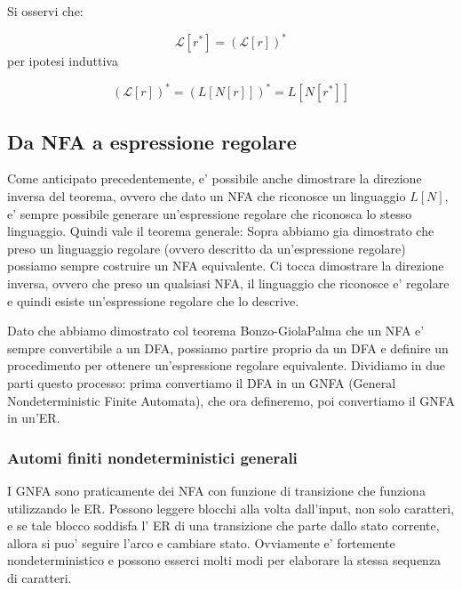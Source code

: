 {\begin{itemize}
\begin{center}
        \end{center}

        Si osservi che:

        \[
            \mathcal{L}[r^*] = (\mathcal{L}[r])^* 
        \]
        per ipotesi induttiva

        \[
            (\mathcal{L}[r])^* = (L[N[r]])^* = L[N[r^*]]
        \]
    \end{itemize}
}

\subsection{Da NFA a espressione regolare}
Come anticipato precedentemente, e' possibile anche dimostrare la direzione inversa del teorema, ovvero che dato un NFA che riconosce un linguaggio $ L[N] $, e' sempre possibile generare un'espressione regolare che riconosca lo stesso linguaggio. Quindi vale il teorema generale:
Sopra abbiamo gia dimostrato che preso un linguaggio regolare (ovvero descritto da un'espressione regolare) possiamo sempre costruire un NFA equivalente. Ci tocca dimostrare la direzione inversa, ovvero che preso un qualsiasi NFA, il linguaggio che riconosce e' regolare e quindi esiste un'espressione regolare che lo descrive.

Dato che abbiamo dimostrato col teorema Bonzo-GiolaPalma che un NFA e' sempre convertibile a un DFA, possiamo partire proprio da un DFA e definire un procedimento per ottenere un'espressione regolare equivalente. Dividiamo in due parti questo processo: prima convertiamo il DFA in un GNFA (General Nondeterministic Finite Automata), che ora defineremo, poi convertiamo il GNFA in un'ER.

\subsubsection{Automi finiti nondeterministici generali}
I GNFA sono praticamente dei NFA con funzione di transizione che funziona utilizzando le ER. Possono leggere blocchi alla volta dall'input, non solo caratteri, e se tale blocco soddisfa l' ER di una transizione che parte dallo stato corrente, allora si puo' seguire l'arco e cambiare stato. Ovviamente e' fortemente nondeterministico e possono esserci molti modi per elaborare la stessa sequenza di caratteri. 

